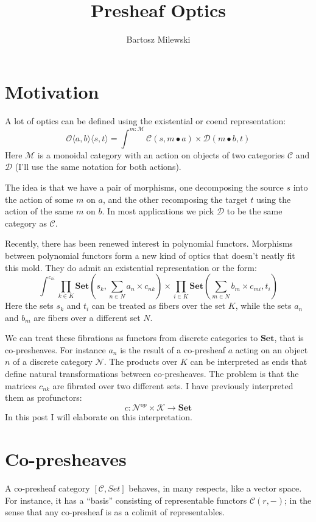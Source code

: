 \documentclass[11pt]{amsart}
\author{Bartosz Milewski}
\title{Presheaf Optics}
\newcommand{\cat}[1]{\mathcal{#1}}%
\newcommand{\Cat}[1]{\mathbf{#1}}%
\newcommand{\Set}{\Cat{Set}}
\begin{document}
\maketitle{}

\section{Motivation}

A lot of optics can be defined using the existential or coend representation:
\[ \mathcal{O}\langle a, b\rangle \langle s, t \rangle = \int^{m \colon \cat M} \cat C (s, m \bullet a) \times \cat D ( m \bullet b, t) \]
Here $\cat M$ is a monoidal category with an action on objects of two categories $\cat C$ and $\cat D$ (I'll use the same notation for both actions).

The idea is that we have a pair of morphisms, one decomposing the source $s$ into the action of some $m$ on $a$, and the other recomposing the target $t$ using the action of the same $m$ on $b$. In most applications we pick $\cat D$ to be the same category as $\cat C$.

Recently, there has been renewed interest in polynomial functors. Morphisms between polynomial functors form a new kind of optics that doesn't neatly fit this mold. They do admit an existential representation or the form:
\[ \int^{c_{k i}} 
 \prod_{k \in K} \mathbf{Set} \left(s_k,  \sum_{n \in N} a_n \times c_{n k} \right) \times 
 \prod_{i \in K}  \mathbf{Set} \left(\sum_{m \in N} b_m \times c_{m i}, t_i \right) \]
Here the sets $s_k$ and $t_i$ can be treated as fibers over the set $K$, while the sets $a_n$ and $b_m$ are fibers over a different set $N$. 

We can treat these fibrations as functors from discrete categories to $\Set$, that is co-presheaves. For instance $a_n$ is the result of a co-presheaf $a$ acting on an object $n$ of a discrete category $\cat N$. The products over $K$ can be interpreted as ends that define natural transformations between co-presheaves. The problem is that the matrices $c_{n k}$ are fibrated over two different sets. I have previously interpreted them as profunctors:
\[ c \colon \cat N^{op} \times \cat K \to \Set \]
In this post I will elaborate on this interpretation.

\section{Co-presheaves}

A co-presheaf category  $[\cat C, Set ]$ behaves, in many respects, like a vector space. For instance, it has a ``basis'' consisting of representable functors $\cat C (r, -)$; in the sense that any co-presheaf is as a colimit of representables. 
\end{document}
